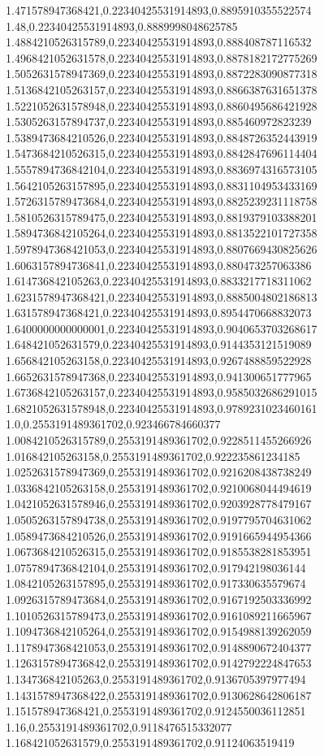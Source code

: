 1.471578947368421,0.22340425531914893,0.8895910355522574
1.48,0.22340425531914893,0.8889998048625785
1.4884210526315789,0.22340425531914893,0.888408787116532
1.4968421052631578,0.22340425531914893,0.8878182172775269
1.5052631578947369,0.22340425531914893,0.8872283090877318
1.5136842105263157,0.22340425531914893,0.8866387631651378
1.5221052631578948,0.22340425531914893,0.8860495686421928
1.5305263157894737,0.22340425531914893,0.885460972823239
1.5389473684210526,0.22340425531914893,0.8848726352443919
1.5473684210526315,0.22340425531914893,0.8842847696114404
1.5557894736842104,0.22340425531914893,0.8836974316573105
1.5642105263157895,0.22340425531914893,0.8831104953433169
1.5726315789473684,0.22340425531914893,0.8825239231118758
1.5810526315789475,0.22340425531914893,0.8819379103388201
1.5894736842105264,0.22340425531914893,0.8813522101727358
1.5978947368421053,0.22340425531914893,0.8807669430825626
1.6063157894736841,0.22340425531914893,0.880473257063386
1.614736842105263,0.22340425531914893,0.8833217718311062
1.6231578947368421,0.22340425531914893,0.8885004802186813
1.631578947368421,0.22340425531914893,0.8954470668832073
1.6400000000000001,0.22340425531914893,0.9040653703268617
1.648421052631579,0.22340425531914893,0.9144353121519089
1.656842105263158,0.22340425531914893,0.9267488859522928
1.6652631578947368,0.22340425531914893,0.941300651777965
1.6736842105263157,0.22340425531914893,0.9585032686291015
1.6821052631578948,0.22340425531914893,0.9789231023460161
1.0,0.2553191489361702,0.923466784660377
1.0084210526315789,0.2553191489361702,0.9228511455266926
1.016842105263158,0.2553191489361702,0.922235861234185
1.0252631578947369,0.2553191489361702,0.9216208438738249
1.0336842105263158,0.2553191489361702,0.9210068044494619
1.0421052631578946,0.2553191489361702,0.9203928778479167
1.0505263157894738,0.2553191489361702,0.9197795704631062
1.0589473684210526,0.2553191489361702,0.9191665944954366
1.0673684210526315,0.2553191489361702,0.9185538281853951
1.0757894736842104,0.2553191489361702,0.917942198036144
1.0842105263157895,0.2553191489361702,0.917330635579674
1.0926315789473684,0.2553191489361702,0.9167192503336992
1.1010526315789473,0.2553191489361702,0.9161089211665967
1.1094736842105264,0.2553191489361702,0.9154988139262059
1.1178947368421053,0.2553191489361702,0.9148890672404377
1.1263157894736842,0.2553191489361702,0.9142792224847653
1.134736842105263,0.2553191489361702,0.9136705397977494
1.1431578947368422,0.2553191489361702,0.9130628642806187
1.151578947368421,0.2553191489361702,0.9124550036112851
1.16,0.2553191489361702,0.9118476515332077
1.168421052631579,0.2553191489361702,0.91124063519419
